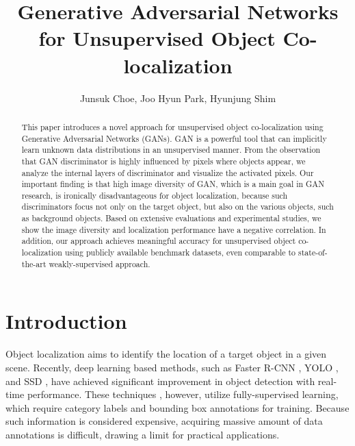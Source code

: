 \documentclass[runningheads]{llncs}
\begin{document}
\pagestyle{headings}
\mainmatter

\title{Generative Adversarial Networks for Unsupervised Object Co-localization}


\author{Junsuk Choe, Joo Hyun Park, Hyunjung Shim}


\maketitle


\begin{abstract}
This paper introduces a novel approach for unsupervised object co-localization using Generative Adversarial Networks (GANs). GAN is a powerful tool that can implicitly learn unknown data distributions in an unsupervised manner. From the observation that GAN discriminator is highly influenced by pixels where objects appear, we analyze the internal layers of discriminator and visualize the activated pixels. Our important finding is that high image diversity of GAN, which is a main goal in GAN research, is ironically disadvantageous for object localization, because such discriminators focus not only on the target object, but also on the various objects, such as background objects. Based on extensive evaluations and experimental studies, we show the image diversity and localization performance have a negative correlation. In addition, our approach achieves meaningful accuracy for unsupervised object co-localization using publicly available benchmark datasets, even comparable to state-of-the-art weakly-supervised approach.
\end{abstract}

\section{Introduction}
\label{sec:introduction}

Object localization aims to identify the location of a target object in a given scene. Recently, deep learning based methods, such as Faster R-CNN \cite{ren2017faster}, YOLO \cite{redmon2016yolo}, and SSD \cite{liu2016ssd}, have achieved significant improvement in object detection with real-time performance. These techniques \cite{ren2017faster,redmon2016yolo,liu2016ssd,krizhevsky2012imagenet,sermanet2013overfeat,simonyan2014very,szegedy2015going,he2016deep,girshick2015fast,girshick2014rich,redmon2016yolo9000}, however, utilize fully-supervised learning, which require category labels and bounding box annotations for training. Because such information is considered expensive, acquiring massive amount of data annotations is difficult, drawing a limit for practical applications.
\end{document}
